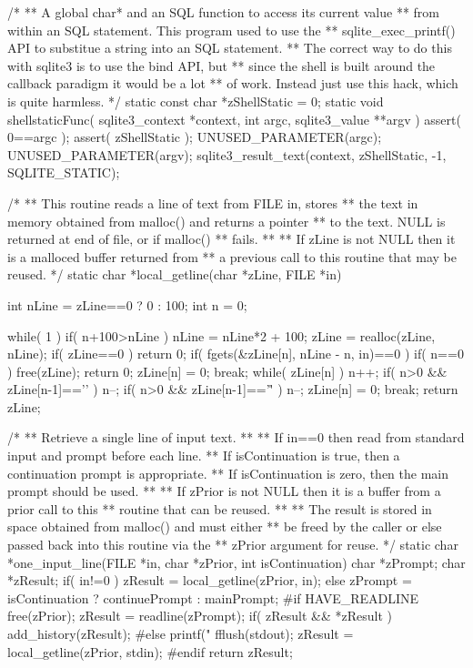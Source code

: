 \begin{Codex}[label=shell.c,numbers=left]
/*
** A global char* and an SQL function to access its current value 
** from within an SQL statement. This program used to use the 
** sqlite_exec_printf() API to substitue a string into an SQL statement.
** The correct way to do this with sqlite3 is to use the bind API, but
** since the shell is built around the callback paradigm it would be a lot
** of work. Instead just use this hack, which is quite harmless.
*/
static const char *zShellStatic = 0;
static void shellstaticFunc(
  sqlite3_context *context,
  int argc,
  sqlite3_value **argv
){
  assert( 0==argc );
  assert( zShellStatic );
  UNUSED_PARAMETER(argc);
  UNUSED_PARAMETER(argv);
  sqlite3_result_text(context, zShellStatic, -1, SQLITE_STATIC);
}


/*
** This routine reads a line of text from FILE in, stores
** the text in memory obtained from malloc() and returns a pointer
** to the text.  NULL is returned at end of file, or if malloc()
** fails.
**
** If zLine is not NULL then it is a malloced buffer returned from
** a previous call to this routine that may be reused.
*/
static char *local_getline(char *zLine, FILE *in){
  int nLine = zLine==0 ? 0 : 100;
  int n = 0;

  while( 1 ){
    if( n+100>nLine ){
      nLine = nLine*2 + 100;
      zLine = realloc(zLine, nLine);
      if( zLine==0 ) return 0;
    }
    if( fgets(&zLine[n], nLine - n, in)==0 ){
      if( n==0 ){
        free(zLine);
        return 0;
      }
      zLine[n] = 0;
      break;
    }
    while( zLine[n] ) n++;
    if( n>0 && zLine[n-1]=='\n' ){
      n--;
      if( n>0 && zLine[n-1]=='\r' ) n--;
      zLine[n] = 0;
      break;
    }
  }
  return zLine;
}

/*
** Retrieve a single line of input text.
**
** If in==0 then read from standard input and prompt before each line.
** If isContinuation is true, then a continuation prompt is appropriate.
** If isContinuation is zero, then the main prompt should be used.
**
** If zPrior is not NULL then it is a buffer from a prior call to this
** routine that can be reused.
**
** The result is stored in space obtained from malloc() and must either
** be freed by the caller or else passed back into this routine via the
** zPrior argument for reuse.
*/
static char *one_input_line(FILE *in, char *zPrior, int isContinuation){
  char *zPrompt;
  char *zResult;
  if( in!=0 ){
    zResult = local_getline(zPrior, in);
  }else{
    zPrompt = isContinuation ? continuePrompt : mainPrompt;
#if HAVE_READLINE
    free(zPrior);
    zResult = readline(zPrompt);
    if( zResult && *zResult ) add_history(zResult);
#else
    printf("%
    fflush(stdout);
    zResult = local_getline(zPrior, stdin);
#endif
  }
  return zResult;
}


\end{Codex}
